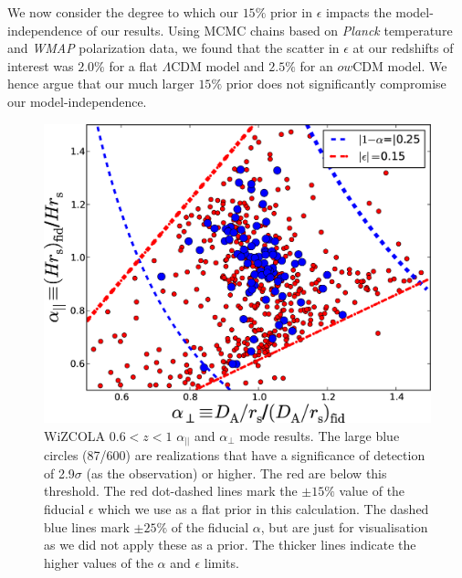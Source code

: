 \documentclass[iop,twocolappendix]{emulateapj}
\begin{document}
We now consider the degree to which our $15\%$ prior in $\epsilon$
impacts the model-independence of our results.  Using MCMC chains
based on {\sl Planck} temperature and {\sl WMAP} polarization data, we
found that the scatter in $\epsilon$ at our redshifts of interest was
$2.0\%$ for a flat $\Lambda$CDM model and $2.5\%$ for an $ow$CDM
model.  We hence argue that our much larger $15\%$ prior does not
significantly compromise our model-independence.

\begin{figure}
\begin{center}
\includegraphics[width=0.7\columnwidth]{figures/WiZCOLA_mode_z0pt6_1pt0/WiZCOLA_mode_z0pt6_1pt0}
\caption{\label{fig:wizcola_hdaModes_z60_epsilonT15} WiZCOLA $0.6<z<1$ $\alpha_{||}$ and $\alpha_\perp$ mode results. The large blue circles (87/600) are realizations that have a significance of detection of 2.9$\sigma$ (as the observation) or higher. The red are below this threshold. The red dot-dashed lines mark the $\pm15\%$ value of the fiducial $\epsilon$ which we use as a flat prior in this calculation. The dashed blue lines mark $\pm25\%$ of the fiducial $\alpha$, but are just for visualisation as we did not apply these as a prior. The thicker lines indicate the higher values of the $\alpha$ and $\epsilon$ limits.%
}
\end{center}
\end{figure}
\end{document}
